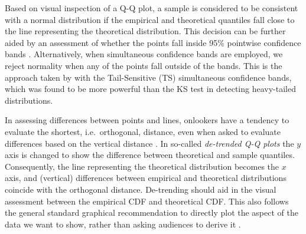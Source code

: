 \documentclass[12pt]{article}\usepackage[]{graphicx}\usepackage[]{color}
\newcommand{\alnote}[1]{\todo[inline,color=green!40]{#1}}
\newcommand{\hhnote}[1]{\todo[inline,color=magenta!40]{#1}}
\begin{document}


Based on visual inspection of a Q-Q plot, a
 sample is considered to be consistent with a normal distribution if the empirical and theoretical quantiles fall close to the line representing the theoretical distribution.  This decision can be further aided by an assessment of
 whether the points fall inside 95\%  pointwise confidence bands \citep[][p.~150--154]{Davison:1997}. Alternatively, when simultaneous confidence bands are employed, we reject normality when any of the points fall outside of the bands. This is the approach taken by \citet{buja:2013} with the Tail-Sensitive (TS) simultaneous confidence bands, which was found to be more powerful than the KS test in detecting heavy-tailed distributions.


In assessing differences between points and lines, onlookers have a tendency to evaluate the shortest, i.e.~orthogonal, distance, even when asked to evaluate differences based on the vertical distance \citep{sineillusion, robbins:2005, cleveland:1984}. 
In so-called {\it de-trended Q-Q plots} \citep[][p.~25--26]{thode:2002} the $y$ axis is changed to show the difference between theoretical and sample quantiles. 
Consequently, the line representing the theoretical distribution becomes the $x$ axis,
and (vertical) differences between empirical and theoretical distributions coincide with the orthogonal distance. 
De-trending should aid in the visual assessment between the empirical CDF and theoretical CDF. This also follows the general standard graphical recommendation to directly plot the aspect of the data we want to show, rather than asking audiences to derive it \citep{wainer:2000}.
\end{document}
